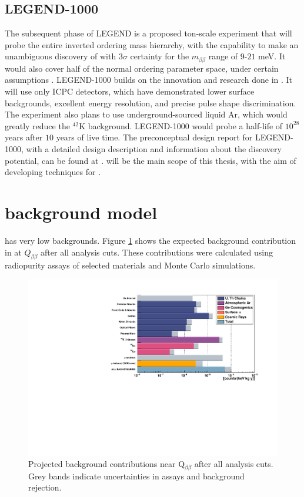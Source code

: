 \subsection{LEGEND-1000}
The subsequent phase of LEGEND is a proposed ton-scale experiment that will probe the entire inverted ordering mass hierarchy, with the capability to make an unambiguous discovery of {\onbb} with $3\sigma$ certainty for the $m_{\beta\beta}$ range of $9$-$21$ meV. It would also cover half of the normal ordering parameter space, under certain assumptions \cite{l1000_pcdr}. LEGEND-1000 builds on the innovation and research done in {\Ltwo}. It will use only ICPC detectors, which have demonstrated lower surface backgrounds, excellent energy resolution, and precise pulse shape discrimination. The experiment also plans to use underground-sourced liquid Ar, which would greatly reduce the $^{42}$K background. LEGEND-1000 would probe a half-life of $10^{28}$ years after $10$ years of live time. The preconceptual design report for LEGEND-1000, with a detailed design description and information about the discovery potential, can be found at \cite{l1000_pcdr}. {\Ltwo} will be the main scope of this thesis, with the aim of developing techniques for {\Lthou}.

\section{{\Ltwo} background model}
{\Ltwo} has very low backgrounds. Figure \ref{fig:L200_background} shows the expected background contribution in {\Ltwo} at $Q_{\beta \beta}$ after all analysis cuts. These contributions were calculated using radiopurity assays of selected materials and Monte Carlo simulations. 

\begin{figure}[!htb]
\centering
  \includegraphics[width=0.99\linewidth]{ch2/figs/L200_background.pdf}
  \caption{{\Ltwo} Projected background contributions near Q$_{\beta\beta}$ after all analysis cuts. Grey bands indicate uncertainties in assays and background rejection.}
\label{fig:L200_background}
  \end{figure}


